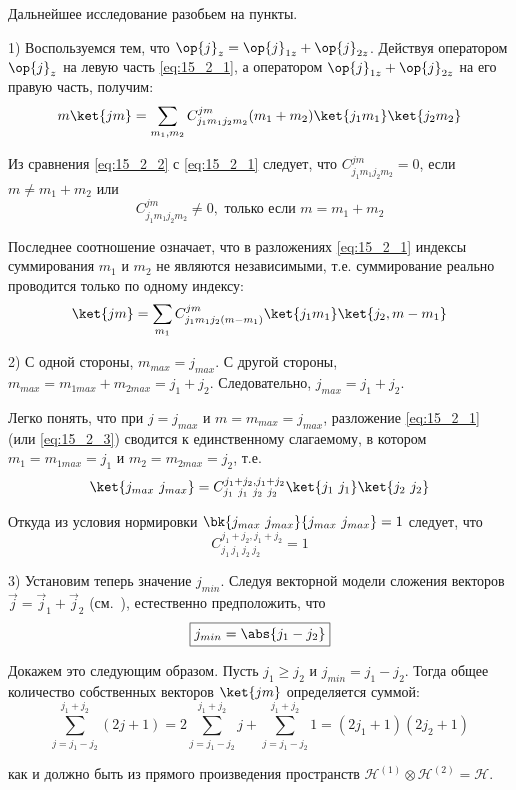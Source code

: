 Дальнейшее исследование разобьем на пункты.

1) Воспользуемся тем, что $\op{j}_z = \op{j}_{1z} + \op{j}_{2z}$. Действуя оператором $\op{j}_z$ на левую часть \eqref{eq:15_2_1}, а оператором $\op{j}_{1z} + \op{j}_{2z}$ на его правую часть, получим:
\begin{equation}
\label{eq:15_2_2}
m\ket{j m} = \sum_{m_1, m_2} C^{j m}_{j_1 m_1 j_2 m_2} (m_1 + m_2)\ket{j_1 m_1}\ket{j_2 m_2}
\end{equation}

Из сравнения \eqref{eq:15_2_2} с \eqref{eq:15_2_1} следует, что $C^{j m}_{j_1 m_1 j_2 m_2} = 0$, если $m \neq m_1 + m_2$ или
$$
\boxed{C^{j m}_{j_1 m_1 j_2 m_2} \neq 0, \text{~только если~} m = m_1 + m_2}
$$

Последнее соотношение означает, что в разложениях \eqref{eq:15_2_1} индексы суммирования $m_1$ и $m_2$ не являются независимыми, т.е. суммирование реально проводится только по одному индексу:
\begin{equation}
\label{eq:15_2_3}
\ket{j m} = \sum_{m_1} C^{j m}_{j_1 m_1 j_2 (m - m_1)} \ket{j_1 m_1}\ket{j_2, m - m_1}
\end{equation}

2) С одной стороны, $m_{max} = j_{max}$. С другой стороны, $m_{max} = m_{1max} + m_{2max} = j_1 + j_2$. Следовательно, $\boxed{j_{max} = j_1 + j_2}$.

Легко понять, что при $j = j_{max}$ и $m = m_{max} = j_{max}$, разложение \eqref{eq:15_2_1} (или \eqref{eq:15_2_3}) сводится к единственному слагаемому, в котором $m_1 = m_{1max} = j_1$ и $m_2 = m_{2max} = j_2$, т.е.
$$
\ket{j_{max}~j_{max}} = C^{j_1+j_2, j_1 + j_2}_{j_1~j_1~j_2~j_2} \ket{j_1~j_1}\ket{j_2~j_2}
$$

Откуда из условия нормировки $\bk{j_{max}~j_{max}}{j_{max}~j_{max}} = 1$ следует, что 
$$
\boxed{C^{j_1+j_2, j_1 + j_2}_{j_1~j_1~j_2~j_2} = 1}
$$

3) Установим теперь значение $j_{min}$. Следуя векторной модели сложения векторов $\vec j = \vec j_1 + \vec j_2$ (см.~), естественно предположить, что 
$$
\boxed{j_{min} = \abs{j_1 - j_2}}
$$

Докажем это следующим образом. Пусть $j_1 \ge j_2$ и $j_{min} = j_1 - j_2$. Тогда общее количество собственных векторов $\ket{j m}$ определяется суммой:
$$
\sum_{j = j_1 - j_2}^{j_1 + j_2} (2j + 1) = 2 \sum_{j = j_1 - j_2}^{j_1 + j_2} j + \sum_{j = j_1 - j_2}^{j_1 + j_2} 1 = (2j_1 + 1)(2j_2 + 1)
$$

как и должно быть из прямого произведения пространств $\mathcal{H}^{(1)} \otimes \mathcal{H}^{(2)} = \mathcal{H}$.
 
